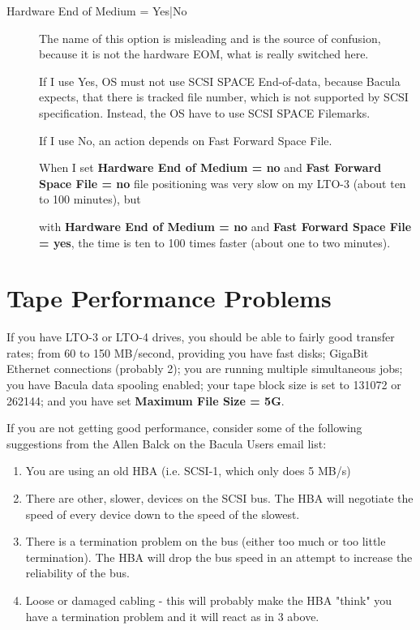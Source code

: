\begin{description}
\item [Hardware End of Medium = Yes|No]
  The name of this option is misleading and is the source of confusion,
  because it is not the hardware EOM, what is really switched here.

  If I use Yes, OS must not use SCSI SPACE End-of-data, because Bacula
  expects, that there is tracked file number, which is not supported by
  SCSI specification.  Instead, the OS have to use SCSI SPACE Filemarks.

  If I use No, an action depends on Fast Forward Space File.

  When I set {\bf Hardware End of Medium = no}
  and {\bf Fast Forward Space File = no}
  file positioning was very slow
  on my LTO-3 (about ten to 100 minutes), but

  with {\bf Hardware End of Medium = no} and
{\bf Fast Forward Space File = yes}, the time is ten to
100 times faster (about one to two minutes).

\end{description}

\section{Tape Performance Problems}
If you have LTO-3 or LTO-4 drives, you should be able to
fairly good transfer rates; from 60 to 150 MB/second, providing
you have fast disks; GigaBit Ethernet connections (probably 2); you are
running multiple simultaneous jobs; you have Bacula data spooling
enabled; your tape block size is set to 131072 or 262144; and
you have set {\bf Maximum File Size = 5G}.

If you are not getting good performance, consider some of the following
suggestions from the Allen Balck on the Bacula Users email list:

\begin{enumerate}
\item You are using an old HBA (i.e. SCSI-1, which only does 5 MB/s)

\item There are other, slower, devices on the SCSI bus. The HBA will
   negotiate the speed of every device down to the speed of the
   slowest.

\item There is a termination problem on the bus (either too much or
   too little termination). The HBA will drop the bus speed in an
   attempt to increase the reliability of the bus.

\item Loose or damaged cabling - this will probably make the HBA "think"
   you have a termination problem and it will react as in 3 above.
\end{enumerate}

